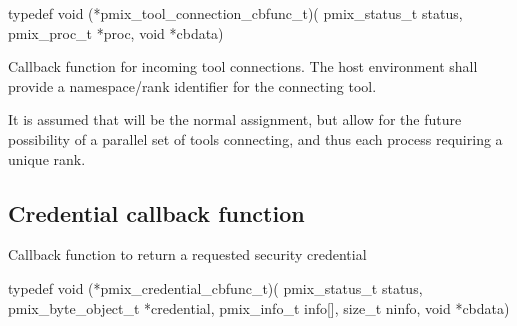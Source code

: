\format

\cspecificstart
\begin{codepar}
typedef void (*pmix_tool_connection_cbfunc_t)(
                             pmix_status_t status,
                             pmix_proc_t *proc, void *cbdata)
\end{codepar}
\cspecificend

\begin{arglist}
\end{arglist}

\descr

Callback function for incoming tool connections.
The host environment shall provide a namespace/rank identifier for the connecting tool.

\advicermstart
It is assumed that  will be the normal assignment, but allow for the future possibility of a parallel set of tools connecting, and thus each process requiring a unique rank.
\advicermend

\subsection{Credential callback function}

\summary

Callback function to return a requested security credential

\format

\cspecificstart
\begin{codepar}
typedef void (*pmix_credential_cbfunc_t)(
                             pmix_status_t status,
                             pmix_byte_object_t *credential,
                             pmix_info_t info[], size_t ninfo,
                             void *cbdata)
\end{codepar}
\cspecificend

\begin{arglist}
\end{arglist}

